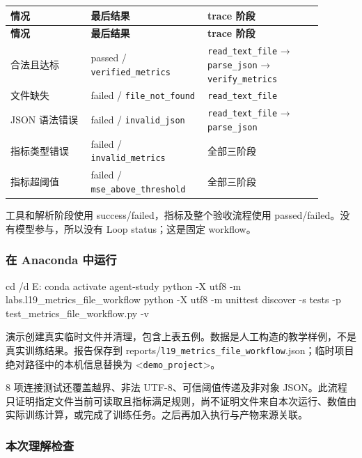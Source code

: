 {\small\setlength{\tabcolsep}{4pt}
\renewcommand{\arraystretch}{1.25}
\begin{longtable}{>{\raggedright\arraybackslash}p{0.23\linewidth}>{\raggedright\arraybackslash}p{0.33\linewidth}>{\raggedright\arraybackslash}p{0.33\linewidth}}
\toprule
\textbf{情况} & \textbf{最后结果} & \textbf{trace 阶段} \\
\midrule\endfirsthead
\toprule
\textbf{情况} & \textbf{最后结果} & \textbf{trace 阶段} \\
\midrule\endhead
\bottomrule\endfoot
合法且达标 & passed / \nolinkurl{verified_metrics} & \nolinkurl{read_text_file} → \nolinkurl{parse_json} → \nolinkurl{verify_metrics} \\
文件缺失 & failed / \nolinkurl{file_not_found} & \nolinkurl{read_text_file} \\
JSON 语法错误 & failed / \nolinkurl{invalid_json} & \nolinkurl{read_text_file} → \nolinkurl{parse_json} \\
指标类型错误 & failed / \nolinkurl{invalid_metrics} & 全部三阶段 \\
指标超阈值 & failed / \nolinkurl{mse_above_threshold} & 全部三阶段 \\
\end{longtable}}

工具和解析阶段使用 success/failed，指标及整个验收流程使用 passed/failed。没有模型参与，所以没有 Loop status；这是固定 workflow。

\subsubsection{在 Anaconda 中运行}

\begin{Code}
cd /d E:\study\agent
conda activate agent-study
python -X utf8 -m labs.l19_metrics_file_workflow
python -X utf8 -m unittest discover -s tests -p test_metrics_file_workflow.py -v
\end{Code}

演示创建真实临时文件并清理，包含上表五例。数据是人工构造的教学样例，不是真实训练结果。报告保存到 reports/\nolinkurl{l19_metrics_file_workflow}.json；临时项目绝对路径中的本机信息替换为 <\nolinkurl{demo_project}>。

8 项连接测试还覆盖越界、非法 UTF-8、可信阈值传递及非对象 JSON。此流程只证明指定文件当前可读取且指标满足规则，尚不证明文件来自本次运行、数值由实际训练计算，或完成了训练任务。之后再加入执行与产物来源关联。

\subsubsection{本次理解检查}

